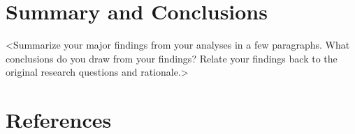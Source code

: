 \documentclass[12pt,]{article}
\begin{document}
\newpage

\hypertarget{summary-and-conclusions}{%
\section{Summary and Conclusions}\label{summary-and-conclusions}}

\textless{}Summarize your major findings from your analyses in a few
paragraphs. What conclusions do you draw from your findings? Relate your
findings back to the original research questions and
rationale.\textgreater{}

\newpage

\hypertarget{references}{%
\section{References}\label{references}}
\end{document}
